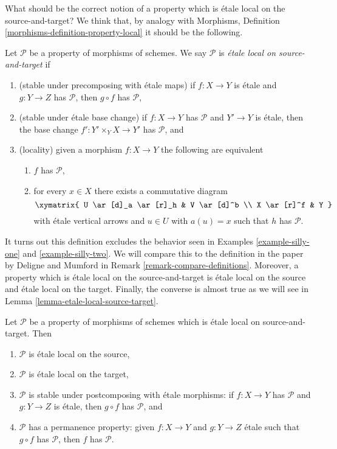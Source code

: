 \noindent
What should be the correct notion of a property which is \'etale local
on the source-and-target? We think that, by analogy with
Morphisms, Definition \ref{morphisms-definition-property-local}
it should be the following.

\begin{definition}
\label{definition-local-source-target}
Let $\mathcal{P}$ be a property of morphisms of schemes.
We say $\mathcal{P}$ is {\it \'etale local on source-and-target} if
\begin{enumerate}
\item (stable under precomposing with \'etale maps)
if $f : X \to Y$ is \'etale and $g : Y \to Z$ has $\mathcal{P}$,
then $g \circ f$ has $\mathcal{P}$,
\item (stable under \'etale base change)
if $f : X \to Y$ has $\mathcal{P}$ and $Y' \to Y$ is \'etale, then
the base change $f' : Y' \times_Y X \to Y'$ has $\mathcal{P}$, and
\item (locality) given a morphism $f : X \to Y$ the following are equivalent
\begin{enumerate}
\item $f$ has $\mathcal{P}$,
\item for every $x \in X$ there exists a commutative diagram
$$
\xymatrix{
U \ar[d]_a \ar[r]_h & V \ar[d]^b \\
X \ar[r]^f & Y
}
$$
with \'etale vertical arrows and $u \in U$ with $a(u) = x$ such that
$h$ has $\mathcal{P}$.
\end{enumerate}
\end{enumerate}
\end{definition}

\noindent
It turns out this definition excludes the behavior seen in
Examples \ref{example-silly-one} and \ref{example-silly-two}.
We will compare this to the definition in the paper
\cite{DM} by Deligne and Mumford in
Remark \ref{remark-compare-definitions}.
Moreover, a property which is \'etale local on the source-and-target is
\'etale local on the source and \'etale local on the target.
Finally, the converse is almost true as we will see in
Lemma \ref{lemma-etale-local-source-target}.

\begin{lemma}
\label{lemma-local-source-target-implies}
Let $\mathcal{P}$ be a property of morphisms of schemes which is
\'etale local on source-and-target. Then
\begin{enumerate}
\item $\mathcal{P}$ is \'etale local on the source,
\item $\mathcal{P}$ is \'etale local on the target,
\item $\mathcal{P}$ is stable under postcomposing with \'etale morphisms:
if $f : X \to Y$ has $\mathcal{P}$ and $g : Y \to Z$ is \'etale, then
$g \circ f$ has $\mathcal{P}$, and
\item $\mathcal{P}$ has a permanence property: given $f : X \to Y$ and
$g : Y \to Z$ \'etale such that $g \circ f$ has $\mathcal{P}$, then
$f$ has $\mathcal{P}$.
\end{enumerate}
\end{lemma}

